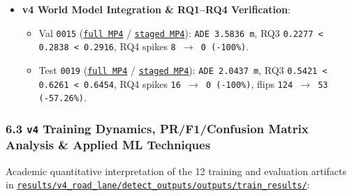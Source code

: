 \documentclass[10.5pt,a4paper]{article}
\begin{document}
\begin{itemize}[leftmargin=1.5em,itemsep=2pt]
\begin{itemize}[leftmargin=1.5em,itemsep=2pt]
\end{itemize}
\item \textbf{v4 World Model Integration \& RQ1--RQ4 Verification}:
\begin{itemize}[leftmargin=1.5em,itemsep=2pt]
\item Val \texttt{0015} (\href{https://github.com/Heisnotanimposter/Totalcare\_autonomous\_driving\_Yolov5/blob/main/results/v4\_road\_lane/world\_outputs/v4\_world\_outputs/world\_model\_0015\_full/world\_model\_demo\_0015.mp4}{\texttt{full MP4}} / \href{https://github.com/Heisnotanimposter/Totalcare\_autonomous\_driving\_Yolov5/blob/main/results/v4\_road\_lane/world\_outputs/v4\_world\_outputs/world\_model\_0015\_staged/world\_model\_demo\_0015.mp4}{\texttt{staged MP4}}): \texttt{ADE 3.\allowbreak{}5836 m}, RQ3 \texttt{0.\allowbreak{}2277 < 0.\allowbreak{}2838 < 0.\allowbreak{}2916}, RQ4 spikes \texttt{8 $\rightarrow$ 0 (-\allowbreak{}100\%)}.
\item Test \texttt{0019} (\href{https://github.com/Heisnotanimposter/Totalcare\_autonomous\_driving\_Yolov5/blob/main/results/v4\_road\_lane/world\_outputs/v4\_world\_outputs/world\_model\_0019\_full/world\_model\_demo\_0019.mp4}{\texttt{full MP4}} / \href{https://github.com/Heisnotanimposter/Totalcare\_autonomous\_driving\_Yolov5/blob/main/results/v4\_road\_lane/world\_outputs/v4\_world\_outputs/world\_model\_0019\_staged/world\_model\_demo\_0019.mp4}{\texttt{staged MP4}}): \texttt{ADE 2.\allowbreak{}0437 m}, RQ3 \texttt{0.\allowbreak{}5421 < 0.\allowbreak{}6261 < 0.\allowbreak{}6454}, RQ4 spikes \texttt{16 $\rightarrow$ 0 (-\allowbreak{}100\%)}, flips \texttt{124 $\rightarrow$ 53 (-\allowbreak{}57.\allowbreak{}26\%)}.
\end{itemize}
\end{itemize}

\subsubsection{6.3 \texttt{v4} Training Dynamics, PR/F1/Confusion Matrix Analysis \& Applied ML Techniques}

Academic quantitative interpretation of the 12 training and evaluation artifacts in \href{https://github.com/Heisnotanimposter/Totalcare\_autonomous\_driving\_Yolov5/tree/main/results/v4\_road\_lane/detect\_outputs/outputs/train\_results}{\texttt{results/\allowbreak{}v4\_\allowbreak{}road\_\allowbreak{}lane/\allowbreak{}detect\_\allowbreak{}outputs/\allowbreak{}outputs/\allowbreak{}train\_\allowbreak{}results/\allowbreak{}}}:
\end{document}
